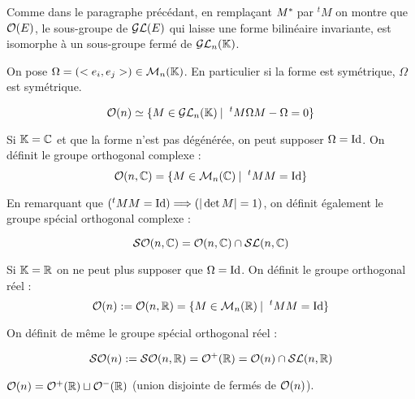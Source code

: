 Comme dans le paragraphe précédant, en remplaçant $M^{*}\hspace{-0.1em}$ par $^tM$ on montre
que $\mathcal{O}(E)$, le sous-groupe de $\mathcal{GL}(E)$ qui laisse une forme bilinéaire
invariante, est isomorphe à un sous-groupe fermé de $\mathcal{GL}_n(\mathbb{K})$.

On pose $\Omega = (<e_i,e_j>) \in \mathcal{M}_n(\mathbb{K})$. En particulier si la forme est
symétrique, $\Omega$ est symétrique.

\begin{prop}[$\O(n)$]
\begin{displaymath}\O(n) \simeq \{ M \in \GL_n(\K) \tq \ ^tM\Omega M - \Omega =
0 \} \end{displaymath}
\end{prop}

\begin{defi}
 
Si $\mathbb{K} = \mathbb{C}$ et que la forme n'est pas dégénérée, on peut supposer $\Omega =
\operatorname{Id}$. On définit le groupe orthogonal complexe :
\begin{displaymath}\mathcal{O}(n,\mathbb{C}) = \{ M \in \mathcal{M}_n(\mathbb{C}) \: | \: \ ^tM M = \operatorname{Id}
\}\end{displaymath}

En remarquant que $(^tMM=\operatorname{Id}) \Longrightarrow (|\det M| = 1)$, on définit
également le groupe spécial orthogonal complexe :

\begin{displaymath}\mathcal{SO}(n,\mathbb{C}) = \mathcal{O}(n,\mathbb{C}) \cap \mathcal{SL}(n,\mathbb{C}) \end{displaymath}
\end{defi}

\begin{defi}
 
Si $\mathbb{K} = \mathbb{R}$ on ne peut plus supposer que $\Omega = \operatorname{Id}$. On définit le groupe
orthogonal réel :
\begin{displaymath}\mathcal{O}(n) := \mathcal{O}(n,\mathbb{R}) = \{ M \in \mathcal{M}_n(\mathbb{R}) \: | \: \ ^tM M = \operatorname{Id}
\}\end{displaymath}

On définit de même le groupe spécial orthogonal réel :

\begin{displaymath}\mathcal{SO}(n) := \mathcal{SO}(n,\mathbb{R}) = \mathcal{O}^+(\mathbb{R}) = \mathcal{O}(n) \cap \mathcal{SL}(n,\mathbb{R})
\end{displaymath}
\end{defi}

\begin{example}[Remarque]
 $\mathcal{O}(n) = \mathcal{O}^+(\mathbb{R}) \sqcup \mathcal{O}^-(\mathbb{R})$ (union disjointe de fermés de $\O(n)$).
\end{example}

